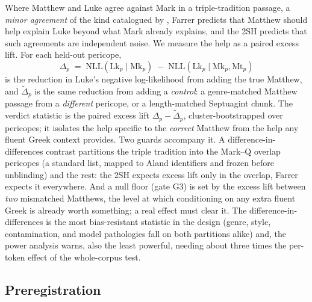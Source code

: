 \documentclass[11pt,letterpaper]{article}
\newcommand{\nll}{\mathrm{NLL}}
\begin{document}
Where Matthew and Luke agree against Mark in a triple-tradition passage, a \emph{minor agreement} of the kind catalogued by \citet{neirynck1974}, Farrer predicts that Matthew should help explain Luke beyond what Mark already explains, and the 2SH predicts that such agreements are independent noise. We measure the help as a paired excess lift. For each held-out pericope,
\[
\Delta_p \;=\; \nll(\text{Lk}_p\mid \text{Mk}_p)\;-\;\nll(\text{Lk}_p\mid \text{Mk}_p,\text{Mt}_p)
\]
is the reduction in Luke's negative log-likelihood from adding the true Matthew, and $\tilde{\Delta}_p$ is the same reduction from adding a \emph{control}: a genre-matched Matthew passage from a \emph{different} pericope, or a length-matched Septuagint chunk. The verdict statistic is the paired excess lift $\Delta_p-\tilde{\Delta}_p$, cluster-bootstrapped over pericopes; it isolates the help specific to the \emph{correct} Matthew from the help any fluent Greek context provides. Two guards accompany it. A difference-in-differences contrast partitions the triple tradition into the Mark--Q overlap pericopes (a standard list, mapped to Aland identifiers and frozen before unblinding) and the rest: the 2SH expects excess lift only in the overlap, Farrer expects it everywhere. And a null floor (gate G3) is set by the excess lift between \emph{two} mismatched Matthews, the level at which conditioning on any extra fluent Greek is already worth something; a real effect must clear it. The difference-in-differences is the most bias-resistant statistic in the design (genre, style, contamination, and model pathologies fall on both partitions alike) and, the power analysis warns, also the least powerful, needing about three times the per-token effect of the whole-corpus test.

\subsection{Preregistration}
\end{document}
